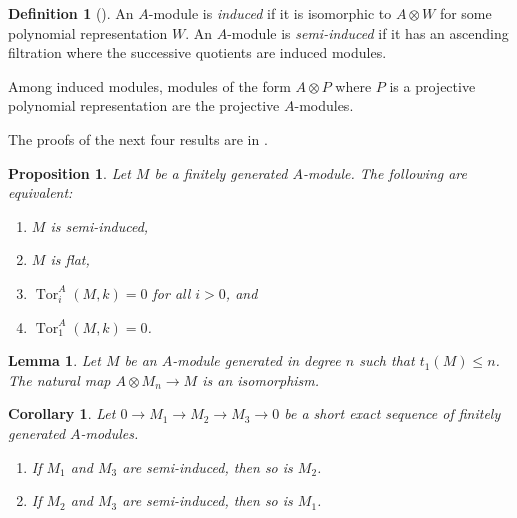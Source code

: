 \documentclass[12pt]{amsart}
\DeclareMathOperator{\Tor}{Tor}
\newcommand{\pol}{\mathrm{pol}}
\DeclareMathOperator{\Rep}{Rep}
\newcommand{\GL}{\mathbf{GL}}
\numberwithin{equation}{section}
\newtheorem{proposition}[equation]{Proposition}
\newtheorem{lemma}[equation]{Lemma}
\newtheorem{corollary}[equation]{Corollary}
\theoremstyle{definition}
\newtheorem{defn}[equation]{Definition}
\newenvironment{definition}[1][]{\begin{defn}[#1]\pushQED{\qed}}{\popQED \end{defn}}
\theoremstyle{plain}
\begin{document}
\begin{definition}
An $A$-module is \textit{induced} if it is isomorphic to $A \otimes W$ for some polynomial representation $W$. An $A$-module is \textit{semi-induced} if it has an ascending filtration where the successive quotients are induced modules.
\end{definition}

Among induced modules, modules of the form $A \otimes P$ where $P$ is a projective polynomial representation are the projective $A$-modules. 

The proofs of the next four results are in \cite[\S~2.4]{gan22ext}.
\begin{proposition}\label{prop:flatequalssemi}
    Let $M$ be a finitely generated $A$-module. The following are equivalent:
    \begin{enumerate}[label=(\alph*), wide=2.1em]
        \item $M$ is semi-induced,
        \item $M$ is flat,
        \item $\Tor_i^A(M, k) = 0$ for all $i > 0$, and
        \item $\Tor_1^A(M, k) = 0$.
    \end{enumerate}
\end{proposition}

\begin{lemma}\label{lem:relationsinlowdeg}
     Let $M$ be an $A$-module generated in degree $n$ such that $t_1(M) \leq n$. The natural map $A \otimes M_n \to M$ is an isomorphism.
\end{lemma}

\begin{corollary}\label{cor:semises}
Let $0 \to M_1 \to M_2 \to M_3 \to 0$ be a short exact sequence of finitely generated $A$-modules.
\begin{enumerate}[label=(\alph*),wide=2.1em]
    \item If $M_1$ and $M_3$ are semi-induced, then so is $M_2$.
    \item If $M_2$ and $M_3$ are semi-induced, then so is $M_1$.
\end{enumerate}
\end{corollary}

\end{document}
